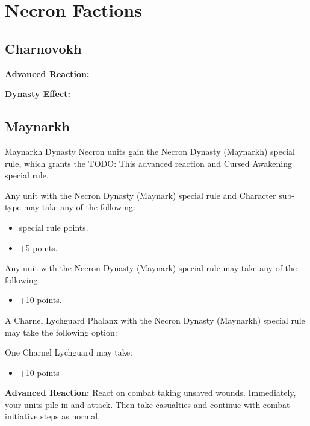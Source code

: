 \section{Necron Factions}

\begin{multicols}{2}
\newpage
\subsection{Charnovokh}

\textbf{Advanced Reaction:}

\textbf{Dynasty Effect:}


\newpage
\subsection{Maynarkh}

Maynarkh Dynasty Necron units gain the Necron Dynasty (Maynarkh) special rule, which grants the TODO: This advanced reaction and Cursed Awakening special rule. 

Any unit with the Necron Dynasty (Maynark) special rule and Character sub-type may take any of the following:
\begin{itemize}
	\item {} special rule  points.
	\item {} \dotfill +5 points.
\end{itemize}

Any unit with the Necron Dynasty (Maynark) special rule may take any of the following:
\begin{itemize}
	\item {} \dotfill +10 points.
\end{itemize}

A Charnel Lychguard Phalanx with the Necron Dynasty (Maynarkh) special rule may take the following option:

One Charnel Lychguard may take:
\begin{itemize}
	\item {} \dotfill +10 points
\end{itemize} 

\textbf{Advanced Reaction:} React on combat taking unsaved wounds. Immediately, your units pile in and attack. Then take casualties and continue with combat initiative steps as normal.


\end{multicols}
